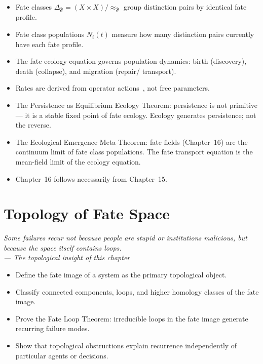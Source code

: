 \documentclass[12pt,twoside,openright]{book}
\newcommand{\fateClasses}{\Delta_{\mathfrak{F}}}
\newcommand{\fateMap}{\mathfrak{F}}
\newenvironment{epigraph}[2]{%
  \vspace{1em}\begin{flushright}
  \begin{minipage}{0.72\textwidth}
  \itshape\small #1\\[0.4em]
  \upshape\footnotesize\sffamily\color{DistGray}--- #2
  \end{minipage}\end{flushright}\vspace{1.5em}}{}
\newenvironment{objectives}{%
  \begin{tcolorbox}[colback=DistBlue!5,colframe=DistBlue,
    title={\faCheckCircle\enspace Chapter Objectives},
    fonttitle=\sffamily\bfseries\color{white},
    attach boxed title to top left={yshift=-2mm,xshift=4mm},
    boxed title style={colback=DistBlue},breakable]
  \begin{itemize}[leftmargin=*,nosep]}{%
  \end{itemize}\end{tcolorbox}\vspace{1em}}
\newenvironment{chapsummary}{%
  \begin{tcolorbox}[colback=DistBlue!5,colframe=DistBlue,
    title={\faBookOpen\enspace Summary},
    fonttitle=\sffamily\bfseries\color{white},
    attach boxed title to top left={yshift=-2mm,xshift=4mm},
    boxed title style={colback=DistBlue,rounded corners}]
  \begin{itemize}[nosep,leftmargin=*]}{%
  \end{itemize}\end{tcolorbox}}
\providecommand{\fateClasses}{\Delta_{\mathfrak{F}}}
\begin{document}
\begin{chapsummary}
\item Fate classes $\fateClasses=(X\times X)/{\approx_\fateMap}$
  group distinction pairs by identical fate profile.
\item Fate class populations $N_i(t)$ measure how many
  distinction pairs currently have each fate profile.
\item The fate ecology equation governs population dynamics:
  birth (discovery), death (collapse), and migration (repair/
  transport).
\item Rates are derived from operator actions~\cite{hofbauer1998}, not free
  parameters.
\item The Persistence as Equilibrium Ecology Theorem:
  persistence is not primitive --- it is a stable fixed point
  of fate ecology. Ecology generates persistence; not the
  reverse.
\item The Ecological Emergence Meta-Theorem: fate fields
  (Chapter~16) are the continuum limit of fate class
  populations. The fate transport equation is the mean-field
  limit of the ecology equation.
\item Chapter~16 follows necessarily from Chapter~15.
\end{chapsummary}

\chapter{Topology of Fate Space}
\label{ch:fate-topology}

\begin{epigraph}{Some failures recur not because people are
  stupid or institutions malicious, but because the space
  itself contains loops.}{The topological insight of this chapter}
\end{epigraph}

\begin{objectives}
\item Define the fate image of a system as the primary
  topological object.
\item Classify connected components, loops, and higher
  homology classes of the fate image.
\item Prove the Fate Loop Theorem: irreducible loops in the
  fate image generate recurring failure modes.
\item Show that topological obstructions explain recurrence
  independently of particular agents or decisions.
\end{objectives}
\end{document}
